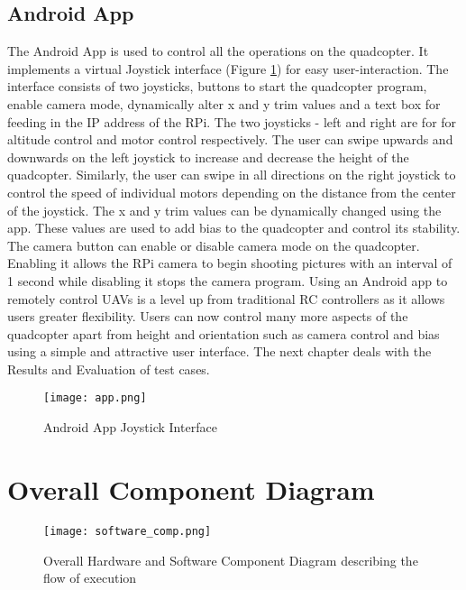 \subsection{Android App}
The Android App is used to control all the operations on the quadcopter. It implements a virtual Joystick interface (Figure \ref{app}) for easy user-interaction.
The interface consists of two joysticks, buttons to start the quadcopter program, enable camera mode, dynamically alter x and y trim values and a text box for feeding in the IP address of the RPi.
\newline
\newline
The two joysticks - left and right are for for altitude control and motor control respectively. The user can swipe upwards and downwards on the left joystick to increase and decrease the height of the quadcopter.  Similarly, the user can swipe in all directions on the right joystick to control the speed of individual motors depending on the distance from the center of the joystick. 
\newline
\newline
The x and y trim values can be dynamically changed using the app. These values are used to add bias to the quadcopter and control its stability. 
The camera button can enable or disable camera mode on the quadcopter. Enabling it allows the RPi camera to begin shooting pictures with an interval of 1 second while disabling it stops the camera program.
\newline
\newline
Using an Android app to remotely control UAVs is a level up from traditional RC controllers as it allows users greater flexibility. Users can now control many more aspects of the quadcopter apart from height and orientation such as camera control and bias using a simple and attractive user interface.
\newline
\newline
The next chapter deals with the Results and Evaluation of test cases.
\begin{figure}[H]
  \centering
  \texttt{[image: app.png]}
  \caption{Android App Joystick Interface}
  \label{app} 
\end{figure}

\section{Overall Component Diagram}
\begin{figure}[H]
  \centering
  \texttt{[image: software\_comp.png]}
  \caption{Overall Hardware and Software Component Diagram describing the flow of execution}
  \label{Software Flow}	
\end{figure}

